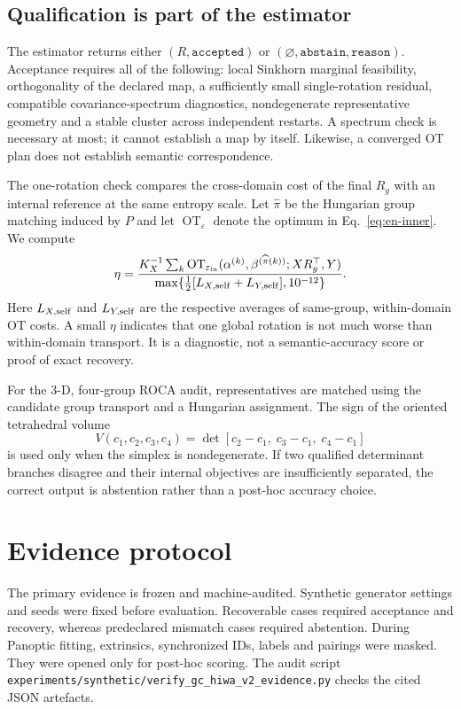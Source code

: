 \documentclass[10pt,a4paper]{article}
\begin{document}
\subsection{Qualification is part of the estimator}
The estimator returns either $(R,\texttt{accepted})$ or $(\varnothing,\texttt{abstain},\texttt{reason})$. Acceptance requires all of the following: local Sinkhorn marginal feasibility, orthogonality of the declared map, a sufficiently small single-rotation residual, compatible covariance-spectrum diagnostics, nondegenerate representative geometry and a stable cluster across independent restarts. A spectrum check is necessary at most; it cannot establish a map by itself. Likewise, a converged OT plan does not establish semantic correspondence.

The one-rotation check compares the cross-domain cost of the final $R_g$ with an internal reference at the same entropy scale. Let $\widehat\pi$ be the Hungarian group matching induced by $P$ and let $\operatorname{OT}_{\varepsilon}$ denote the optimum in Eq.~\ref{eq:en-inner}. We compute
\begin{equation}
\eta=\frac{K_X^{-1}\sum_k\operatorname{OT}_{\varepsilon_{\rm in}}(\alpha^{(k)},\beta^{(\widehat\pi(k))};XR_g^\top,Y)}
{\max\{\tfrac12[L_{X,{\rm self}}+L_{Y,{\rm self}}],10^{-12}\}}.
\label{eq:en-fit-ratio}
\end{equation}
Here $L_{X,{\rm self}}$ and $L_{Y,{\rm self}}$ are the respective averages of same-group, within-domain OT costs. A small $\eta$ indicates that one global rotation is not much worse than within-domain transport. It is a diagnostic, not a semantic-accuracy score or proof of exact recovery.

For the 3-D, four-group ROCA audit, representatives are matched using the candidate group transport and a Hungarian assignment. The sign of the oriented tetrahedral volume
\begin{equation}
V(c_1,c_2,c_3,c_4)=\det[c_2-c_1,\;c_3-c_1,\;c_4-c_1]
\end{equation}
is used only when the simplex is nondegenerate. If two qualified determinant branches disagree and their internal objectives are insufficiently separated, the correct output is abstention rather than a post-hoc accuracy choice.

\section{Evidence protocol}
The primary evidence is frozen and machine-audited. Synthetic generator settings and seeds were fixed before evaluation. Recoverable cases required acceptance and recovery, whereas predeclared mismatch cases required abstention. During Panoptic fitting, extrinsics, synchronized IDs, labels and pairings were masked. They were opened only for post-hoc scoring. The audit script \texttt{experiments/synthetic/verify\_gc\_hiwa\_v2\_evidence.py} checks the cited JSON artefacts.
\end{document}
